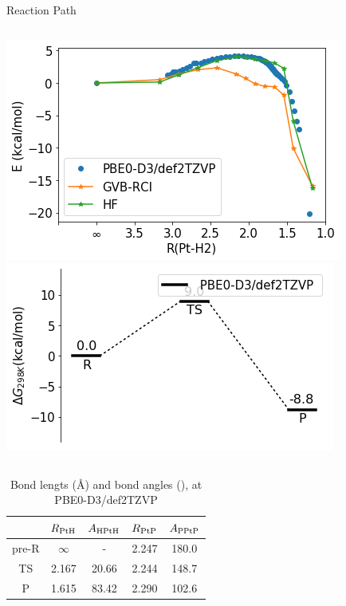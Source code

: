 \documentclass[10pt,aspectratio=43,mathserif]{beamer}
\begin{document}
\begin{frame}
Reaction Path
\begin{columns}
	\includegraphics[width=\linewidth]{../../1030/Pt/pbe0/irc/irc.png}
    \includegraphics[width=\linewidth]{../../1030/Pt/pbe0/Pt.png}
\end{columns}
\begin{table}
	\centering
	\begin{tabular}{ccccc}
		\hline
		& $ R_{\ce{PtH}} $ & $ A_{\ce{HPtH}} $ & $ R_{\ce{PtP}} $ &$ A_{\ce{PPtP}} $\\ \hline
		pre-R & $ \infty $ & - & 2.247 & 180.0 \\
		TS & 2.167 & 20.66 & 2.244 & 148.7 \\
		P & 1.615 & 83.42 & 2.290 & 102.6\\
		\hline
	\end{tabular}
	\caption{Bond lengts (\AA) and bond angles (\textdegree), at PBE0-D3/def2TZVP}
\end{table}


\end{frame}
\end{document}
